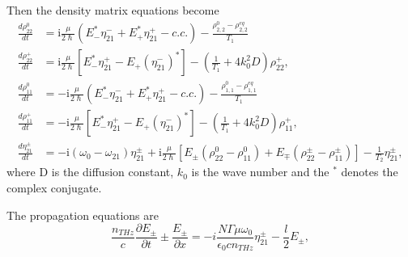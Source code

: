 \documentclass[preprint,secnumarabic,amssymb, nobibnotes, aip, prd]{revtex4-1}
\begin{document}
	Then the density matrix equations become 
	\begin{align}
	\frac{d\rho_{22}^{0}}{dt} &= \mathrm{i}\frac{\mu}{2\hslash}\left(  E_{-}^{\ast}\eta_{21}^{-}+E_{+}^{\ast}\eta_{21}^{+}-c.c.\right) -\frac{\rho_{2,2}^{0}-\rho_{2,2}^{eq}}{T_1} \\
	\frac{d\rho_{22}^{+}}{dt} &= \mathrm{i}\frac{\mu}{2\hslash}\left[  E_{-}^{\ast}\eta_{21}^{+}-E_{+}(\eta_{21}^{-})^{\ast}\right] - \left( \frac{1}{T_1}+4k_{0}^{2}D\right)  \rho_{22}^{+},\label{eq:rtpop3grating}\\
	\frac{d\rho_{11}^{0}}{dt} &=-\mathrm{i}\frac{\mu}{2\hslash}\left(E_{-}^{\ast}\eta_{21}^{-}+E_{+}^{\ast}\eta_{21}^{+}-c.c.\right) -\frac{\rho_{1,1}^{0}-\rho_{1,1}^{eq}}{T_1} \\
	\frac{d\rho_{11}^{+}}{dt} &=-\mathrm{i}\frac{\mu}{2\hslash}\left[E_{-}^{\ast}\eta_{21}^{+}-E_{+}(\eta_{21}^{-})^{\ast}\right] -\left(  \frac{1}{T_1}+4k_{0}^{2}D\right) \rho_{11}^{+}, \label{eq:rtpop2grating} \\
	\frac{d\eta_{21}^{\pm}}{dt} & = -\mathrm{i}\left(  \omega_{0}-\omega_{21}\right) \eta_{21}^{\pm}+\mathrm{i}\frac{\mu}{2\hslash}\left[  E_{\pm}(\rho_{22}^{0}-\rho_{11}^{0})+E_{\mp}(\rho_{22}^{\pm}-\rho_{11}^{\pm})\right]-\frac{1}{T_2}\eta_{21}^{\pm},
	\end{align}
	where D is the diffusion constant, $k_0$ is the wave number and the $^{\ast}$ denotes the complex conjugate.
	
	The propagation equations are
	\begin{equation}
	\frac{n_{THz}}{c}\frac{\partial E_{\pm}}{\partial {t}}\pm\frac{E_{\pm}}{\partial {x}}=-i\frac{N\Gamma\mu\omega_0}{\epsilon_0 c n_{THz}}\eta_{21}^{\pm}-\frac{l}{2}E_{\pm
	}, \label{eq:rtwave}%
	\end{equation}	
	
	
	
	
	
\end{document}
